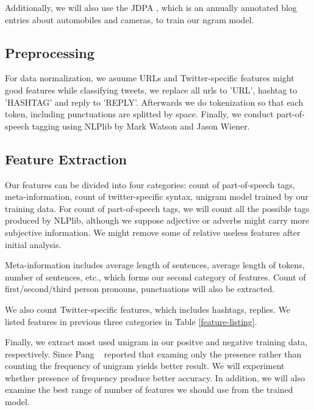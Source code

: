 \documentclass[12pt]{article}
\begin{document}
Additionally, we will also use the JDPA \cite{JDPA}, which is an annually annotated blog entries about automobiles and cameras, to train our ngram model.

\subsection{Preprocessing}\label{preprocessing}
For data normalization, we asuume URLs and Twitter-specific features might good features while classifying tweets, we replace all urls to 'URL', hashtag to 'HASHTAG' and reply to 'REPLY'. Afterwards we do tokenization so that each token, including punctuations are splitted by space. Finally, we conduct part-of-speech tagging using NLPlib \cite{NLPlib} by Mark Watson and Jason Wiener.

\subsection{Feature Extraction}\label{feature-extraction}
Our features can be divided into four categories: count of part-of-speech tags, meta-information, count of twitter-specific syntax, unigram model trained by our training data. For count of part-of-speech tags, we will count all the possible tags produced by NLPlib, although we suppose adjective or adverbs might carry more subjective information. We might remove some of relative useless features after initial analysis.

Meta-information includes average length of sentences, average length of tokens, number of sentences, etc., which forms our second category of features. Count of first/second/third person pronouns, punctuations will also be extracted.

We also count Twitter-specific features, which includes hashtags, replies. We listed features in previous three categories in Table \ref{feature-listing}.

Finally, we extract most used unigram in our positve and negative training data, respectively. Since Pang \etal~\cite{Pang:02} reported that examing only the presence rather than counting the frequency of unigram yields better result. We will experiment whether presence of frequency produce better accuracy. In addition, we will also examine the best range of number of features we should use from the trained model.
\end{document}
